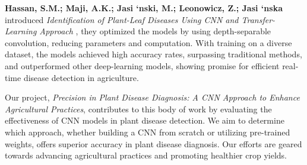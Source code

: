 \textbf{Hassan, S.M.; Maji, A.K.; Jasi `nski, M.; Leonowicz, Z.; Jasi `nska} introduced 
\textit{Identification of Plant-Leaf Diseases Using CNN and Transfer-Learning Approach} \cite{Hassan}, 
they optimized the models by using depth-separable convolution, reducing parameters and computation. 
With training on a diverse dataset, the models achieved high accuracy rates, surpassing traditional methods, 
and outperformed other deep-learning models, showing promise for efficient real-time disease detection in agriculture.

Our project, \textit{Precision in Plant Disease Diagnosis: A CNN Approach to Enhance Agricultural Practices}, 
contributes to this body of work by evaluating the effectiveness of CNN models in plant disease detection. 
We aim to determine which approach, whether building a CNN from scratch or utilizing pre-trained weights, 
offers superior accuracy in plant disease diagnosis. Our efforts are geared towards advancing agricultural 
practices and promoting healthier crop yields.
